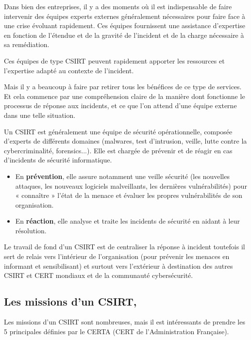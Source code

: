 Dans bien des entreprises, il y a des moments où il est indispensable de faire intervenir des équipes experts externes généralement nécessaires pour faire face à une crise évoluant rapidement. Ces équipes fournissent une assistance d'expertise en fonction de l’étendue et de la gravité de l’incident et de la charge nécessaire à sa remédiation.

Ces équipes de type CSIRT peuvent rapidement apporter les ressources et l’expertise adapté au contexte de l'incident.

 Mais il y a beaucoup à faire par retirer tous les bénéfices de ce type de services. Et cela commence par une compréhension claire de la manière dont fonctionne le processus de réponse aux incidents, et ce que l’on attend d’une équipe externe dans une telle situation.
 
 
 Un CSIRT est généralement une équipe de sécurité opérationnelle, composée d’experts de différents domaines (malwares, test d’intrusion, veille, lutte contre la cybercriminalité, forensics...). Elle est chargée de prévenir et de réagir en cas d’incidents de sécurité informatique.
\begin{itemize}
  \item En \textbf{prévention}, elle assure notamment une veille sécurité (les nouvelles attaques, les nouveaux logiciels malveillants, les dernières vulnérabilités) pour « connaître » l’état de la menace et évaluer les propres vulnérabilités de son organisation.
  \item En \textbf{réaction}, elle analyse et traite les incidents de sécurité en aidant à leur résolution.
\end{itemize}

Le travail de fond d'un CSIRT est de centraliser la réponse à incident toutefois il sert de relais vers l’intérieur de l’organisation (pour prévenir les menaces en informant et sensibilisant) et surtout vers l’extérieur à destination des autres CSIRT et CERT mondiaux et de la communauté cybersécurité.
 
  \subsection{Les missions d’un CSIRT,}
 Les missions d’un CSIRT sont nombreuses, mais il est intéressants de prendre les 5 principales définies par le CERTA (CERT de l'Administration Française).

